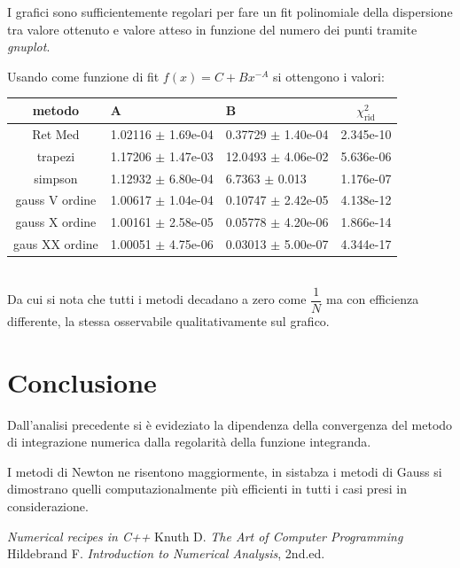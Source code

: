 \documentclass{article}
\begin{document}
I grafici sono sufficientemente regolari per fare un fit polinomiale della dispersione tra valore ottenuto e valore atteso in funzione del numero dei punti tramite \emph{gnuplot}.

Usando come funzione di fit $f(x) = C + B x^{-A}$ si ottengono i valori:

\begin{tabular}{|c|l|l|c|}
\hline
metodo & A & B & $\chi^{2}_{\textrm{rid}}$ \\
\hline \hline
Ret Med        & 1.02116 $\pm$ 1.69e-04 & 0.37729 $\pm$ 1.40e-04 & 2.345e-10\\
\hline
trapezi		   & 1.17206 $\pm$ 1.47e-03 & 12.0493 $\pm$ 4.06e-02 & 5.636e-06\\
\hline
simpson        & 1.12932 $\pm$ 6.80e-04 & 6.7363  $\pm$ 0.013 & 1.176e-07\\
\hline
gauss V ordine & 1.00617 $\pm$ 1.04e-04 & 0.10747 $\pm$ 2.42e-05 & 4.138e-12\\
\hline
gauss X ordine & 1.00161 $\pm$ 2.58e-05 & 0.05778 $\pm$ 4.20e-06 & 1.866e-14\\
\hline 
gaus XX ordine & 1.00051 $\pm$ 4.75e-06 & 0.03013 $\pm$ 5.00e-07 & 4.344e-17\\ 
\hline

\end{tabular}
\\

Da cui si nota che tutti i metodi decadano a zero come $\dfrac{1}{N}$ ma con efficienza differente, la stessa osservabile qualitativamente sul grafico.

\section{Conclusione}

Dall'analisi precedente si è evideziato la dipendenza della convergenza del metodo di integrazione numerica dalla regolarità della funzione integranda.

I metodi di Newton ne risentono maggiormente, in sistabza i metodi di Gauss si dimostrano quelli computazionalmente più efficienti in tutti i casi presi in considerazione.




\begin{thebibliography}{99}
\emph{Numerical recipes in C++}
Knuth D. \emph{The Art of Computer Programming}
Hildebrand F. \emph{Introduction to Numerical Analysis}, 2nd.ed.
\end{thebibliography}
\end{document}
